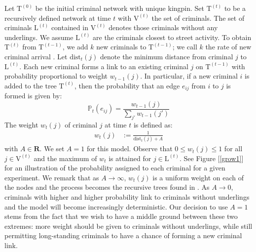 \documentclass[11pt]{article}
\newcommand{\dist}{\textrm{dist}}
\renewcommand{\b}[1]{\mathbf{#1}}
\renewcommand{\t }[1]{\mathrm{#1}}
\newcommand{\bb}[1]{\mathbb{#1}}
\renewcommand{\L}{\mathrm{L}}
\newcommand{\V}{\mathrm{V}}
\theoremstyle{plain}
\theoremstyle{definition}
\begin{document}
Let $\t T^{(0)}$ be the initial criminal network with unique kingpin.  Set $\t T^{(t)}$ to be a recursively defined network at time $t$ with $\V^{(t)}$ the set of criminals.  The set of criminals $\L^{(t)}$ contained in $\V^{(t)}$ denotes those criminals without any underlings.  We assume $\L^{(t)}$ are the criminals closest to street activity.  To obtain $\t T^{(t)}$ from $\t T^{(t-1)}$, we add $k$ new criminals to $\t T^{(t-1)}$; we call $k$ the rate of new criminal arrival . Let $\dist_t(j)$ denote the minimum distance from criminal $j$ to $\L^{(t)}$.  Each new criminal forms a link to an existing criminal $j$ on $\t T^{(t-1)}$ with probability proportional to weight $w_{t-1}(j)$.   In particular, if a new criminal $i$ is added to the tree $\t T^{(t)}$, then the probability that an edge $e_{ij}$ from $i$ to $j$ is formed is given by:
$$
\bb{P}_t(e_{ij}) = \frac{w_{t-1}(j)}{\sum_{j'} w_{t-1}(j')}
$$
The weight $w_t(j)$ of criminal $j$ at time $t$ is defined as:
\begin{align*}
w_t(j)  &:= \frac{1}{\dist_t(j)+A}
\end{align*}
with $A\in \b R$.  We set $A = 1$ for this model.  Observe that $0 \leq w_t(j) \leq 1$ for all $j \in \V^{(t)}$ and the maximum of $w_t$ is attained for $j \in \L^{(t)}$.  See Figure [\ref{grow1}] for an illustration of the probability assigned to each criminal for a given experiment.  We remark that as $A \to \infty$, $w_t(j)$ is a uniform weight on each of the nodes and the process becomes the recursive trees found in \cite{Mahmoud1, Mahmoud2, sz}.  As $A \to 0$, criminals with higher and higher probability link to criminals without underlings and the model will become increasingly deterministic.  Our decision to use $A  = 1$ stems from the fact that we wish to have a middle ground between these two extremes: more weight should be given to criminals without underlings, while still permitting long-standing criminals to have a chance of forming a new criminal link.
\end{document}
